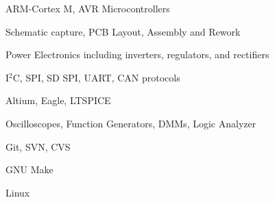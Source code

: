 \begin{cvskillscolumn}

                {\item ARM-Cortex M, AVR Microcontrollers
                 \item Schematic capture, PCB Layout, Assembly and Rework
                 \item Power Electronics including inverters, regulators, and rectifiers
                 \item I$^2$C, SPI, SD SPI, UART, CAN protocols}
                {\item Altium, Eagle, LTSPICE
                 \item Oscilloscopes, Function Generators, DMMs, Logic Analyzer
                 \item Git, SVN, CVS
                 \item GNU Make
                 \item Linux}
\end{cvskillscolumn}
